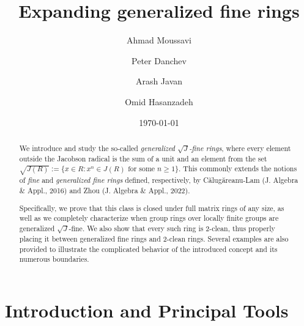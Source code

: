 \documentclass[12pt]{amsart}
\date{\today}
\theoremstyle{definition}
\begin{document}
	
\author[A. Moussavi]{Ahmad Moussavi}
\address{Department of Mathematics, Tarbiat Modares University, 14115-111 Tehran Jalal AleAhmad Nasr, Iran}

\author[P. Danchev]{Peter Danchev}
\address{Institute of Mathematics and Informatics, Bulgarian Academy of Sciences, 1113 Sofia, Bulgaria}

\author[A. Javan]{Arash Javan}
\address{Department of Mathematics, Tarbiat Modares University, 14115-111 Tehran Jalal AleAhmad Nasr, Iran}

\author[O. Hasanzadeh]{Omid Hasanzadeh}
\address{Department of Mathematics, Tarbiat Modares University, 14115-111 Tehran Jalal AleAhmad Nasr, Iran}

\title[generalized $\sqrt{J}$-fine rings]{Expanding generalized fine rings}

\maketitle

\begin{abstract}
We introduce and study the so-called {\it generalized $\sqrt{J}$-fine rings}, where every element outside the Jacobson radical is the sum of a unit and an element from the set $\sqrt{J(R)} := \{ x \in R : x^{n} \in J(R) \text{ for some } n \ge 1 \}$. This commonly extends the notions of {\it fine} and {\it generalized fine rings} defined, respectively, by C\u{a}lug\u{a}reanu-Lam (J. Algebra \& Appl., 2016) and Zhou (J. Algebra \& Appl., 2022).

Specifically, we prove that this class is closed under full matrix rings of any size, as well as we completely characterize when group rings over locally finite groups are generalized $\sqrt{J}$-fine. We also show that every such ring is 2-clean, thus properly placing it between generalized fine rings and 2-clean rings. Several examples are also provided to illustrate the complicated behavior of the introduced concept and its numerous boundaries.
\end{abstract}

\section{Introduction and Principal Tools}
\end{document}
